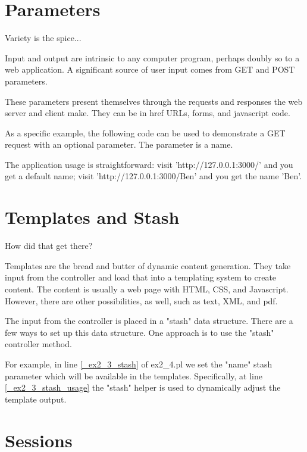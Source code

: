 \documentclass[14pt]{extreport}
\begin{document}
\section{Parameters}

{\Large Variety is the spice...}

Input and output are intrinsic to any computer program, perhaps doubly so to a
web application.  A significant source of user input comes from GET and POST
parameters.

These parameters present themselves through the requests and responses the web
server and client make.  They can be in href URLs, forms, and javascript code.

As a specific example, the following code can be used to demonstrate a GET
request with an optional parameter.  The parameter is a name.



The application usage is straightforward: visit 'http://127.0.0.1:3000/' and
you get a default name; visit 'http://127.0.0.1:3000/Ben' and you get the name
'Ben'.

\section{Templates and Stash}

{\Large How did that get there?}

Templates are the bread and butter of dynamic content generation.  They take
input from the controller and load that into a templating system to create
content.  The content is usually a web page with HTML, CSS, and Javascript.
However, there are other possibilities, as well, such as text, XML, and pdf.

The input from the controller is placed in a "stash" data structure.  There are
a few ways to set up this data structure.  One approach is to use the "stash"
controller method.



For example, in line \ref{_ex2_3_stash} of ex2\_4.pl we set the "name" stash 
parameter which will be available in the templates.  Specifically, at line 
\ref{_ex2_3_stash_usage} the "stash" helper is used to dynamically adjust
the template output.

\section{Sessions}
\end{document}
